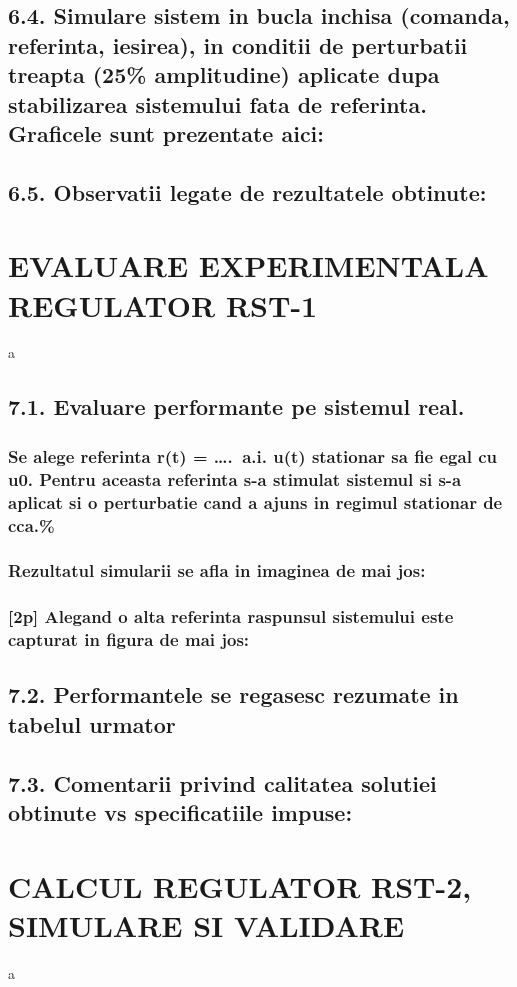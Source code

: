\documentclass[12pt,english]{article}
\begin{document}
\subsection {6.4. Simulare sistem in bucla inchisa (comanda, referinta, iesirea), in conditii de perturbatii treapta (25\% amplitudine) aplicate dupa stabilizarea sistemului fata de referinta. Graficele sunt prezentate aici: }
\subsection {6.5. Observatii legate de rezultatele obtinute: }

\section { EVALUARE EXPERIMENTALA REGULATOR RST-1 }
a
\subsection { 7.1. Evaluare performante pe sistemul real. }
\subsubsection { Se alege referinta r(t) = ….  a.i. u(t) stationar sa fie egal cu u0. Pentru aceasta referinta s-a stimulat sistemul si s-a aplicat si o perturbatie cand a ajuns in regimul stationar de cca.\%}
\subsubsection { Rezultatul simularii se afla in imaginea de mai jos: }
\subsubsection { [2p] Alegand o alta referinta raspunsul sistemului este capturat in figura de mai jos: }
\subsection { 7.2. Performantele se regasesc rezumate in tabelul urmator }
\subsection { 7.3. Comentarii privind calitatea solutiei obtinute vs specificatiile impuse: }

\section { CALCUL REGULATOR RST-2, SIMULARE SI VALIDARE }
a
\end{document}
